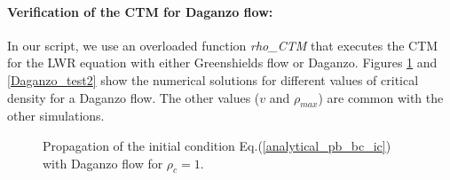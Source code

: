 \documentclass[letterpaper,10pt]{article}
\begin{document}
\paragraph{Verification of the CTM for Daganzo flow:}
In our script, we use an overloaded function \textit{rho\_CTM} that executes the CTM for the LWR equation with either Greenshields flow or Daganzo. Figures \ref{Daganzo_test1} and \ref{Daganzo_test2} show the numerical solutions for different values of critical density for a Daganzo flow. The other values ($v$ and $\rho_{max}$) are common with the other simulations.

\begin{figure}
  \centering
  \caption{Propagation of the initial condition  Eq.(\ref{analytical_pb_bc_ic}) with Daganzo flow for $\rho_c=1$.}\label{Daganzo_test1}
\end{figure}
\end{document}
